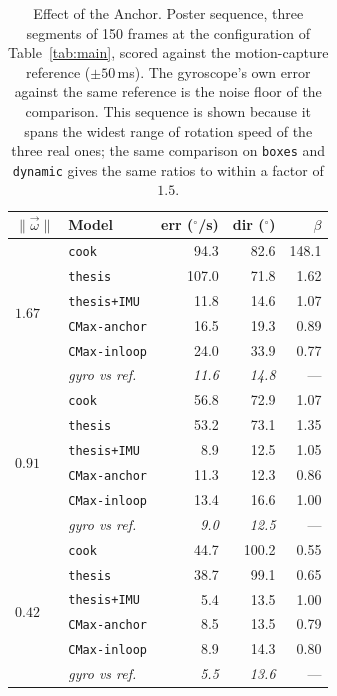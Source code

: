\documentclass[journal]{IEEEtran}
\newcommand{\wvec}{\vec{\omega}}
\begin{document}
\begin{table}[!t]
\renewcommand{\arraystretch}{1.15}
\caption{Effect of the Anchor. \textnormal{Poster sequence, three segments of
150 frames at the configuration of Table~\ref{tab:main}, scored against the
motion-capture reference ($\pm50$\,ms). The gyroscope's own error against the same reference is the noise
floor of the comparison. This sequence is shown because it spans the widest
range of rotation speed of the three real ones; the same comparison on
\texttt{boxes} and \texttt{dynamic} gives the same ratios to within a factor of
$1.5$.}}
\label{tab:anchor}
\centering
\footnotesize
\begin{tabular}{@{}llrrr@{}}
\toprule
$\|\wvec\|$ & Model & err ($^\circ$/s) & dir ($^\circ$) & $\beta$ \\
\midrule
\multirow{6}{*}{$1.67$}
 & \texttt{cook}          &  94.3 &  82.6 & 148.1 \\
 & \texttt{thesis}        & 107.0 &  71.8 &  1.62 \\
 & \texttt{thesis+IMU}    &  11.8 &  14.6 &  1.07 \\
 & \texttt{CMax-anchor}   &  16.5 &  19.3 &  0.89 \\
 & \texttt{CMax-inloop}   &  24.0 &  33.9 &  0.77 \\
 & \emph{gyro vs ref.}     & \emph{11.6} & \emph{14.8} & --- \\
\midrule
\multirow{6}{*}{$0.91$}
 & \texttt{cook}          &  56.8 &  72.9 &  1.07 \\
 & \texttt{thesis}        &  53.2 &  73.1 &  1.35 \\
 & \texttt{thesis+IMU}    &   8.9 &  12.5 &  1.05 \\
 & \texttt{CMax-anchor}   &  11.3 &  12.3 &  0.86 \\
 & \texttt{CMax-inloop}   &  13.4 &  16.6 &  1.00 \\
 & \emph{gyro vs ref.}     & \emph{9.0} & \emph{12.5} & --- \\
\midrule
\multirow{6}{*}{$0.42$}
 & \texttt{cook}          &  44.7 & 100.2 &  0.55 \\
 & \texttt{thesis}        &  38.7 &  99.1 &  0.65 \\
 & \texttt{thesis+IMU}    &   5.4 &  13.5 &  1.00 \\
 & \texttt{CMax-anchor}   &   8.5 &  13.5 &  0.79 \\
 & \texttt{CMax-inloop}   &   8.9 &  14.3 &  0.80 \\
 & \emph{gyro vs ref.}     & \emph{5.5} & \emph{13.6} & --- \\
\bottomrule
\end{tabular}
\end{table}
\end{document}
